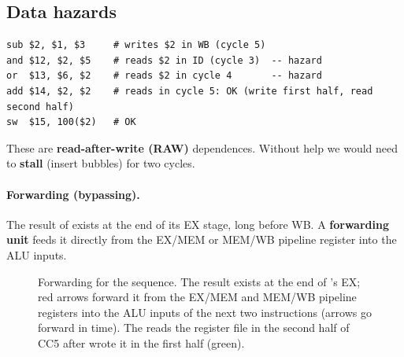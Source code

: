 \subsection{Data hazards}

\begin{lstlisting}[style=mips]
sub $2, $1, $3     # writes $2 in WB (cycle 5)
and $12, $2, $5    # reads $2 in ID (cycle 3)  -- hazard
or  $13, $6, $2    # reads $2 in cycle 4       -- hazard
add $14, $2, $2    # reads in cycle 5: OK (write first half, read second half)
sw  $15, 100($2)   # OK
\end{lstlisting}

These are \textbf{read-after-write (RAW)} dependences. Without help we would
need to \textbf{stall} (insert bubbles) for two cycles.

\paragraph{Forwarding (bypassing).} The result of  exists at the
end of its EX stage, long before WB. A \textbf{forwarding unit} feeds it
directly from the EX/MEM or MEM/WB pipeline register into the ALU inputs.

\begin{figure}[H]
\centering
{}
\caption{Forwarding for the  sequence. The result exists at the
end of 's EX; red arrows forward it from the EX/MEM and MEM/WB
pipeline registers into the ALU inputs of the next two instructions
(arrows go forward in time). The  reads the register file in
the second half of CC5 after  wrote it in the first half
(green).}
\end{figure}


